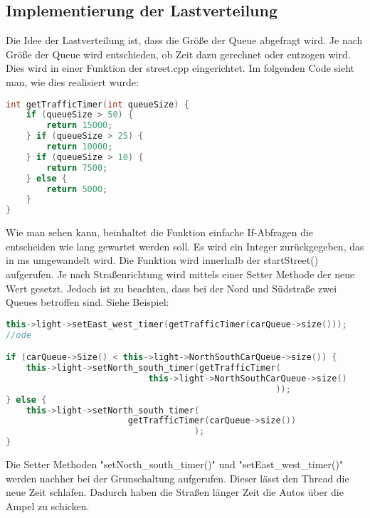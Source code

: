 \documentclass[12pt, oneside]{article}
\begin{document}
\subsection{Implementierung der Lastverteilung}
\label{lastverteilung}
Die Idee der Lastverteilung ist, dass die Größe der Queue abgefragt wird. Je nach Größe der Queue wird entschieden, ob Zeit dazu gerechnet oder entzogen wird. Dies wird in einer Funktion der street.cpp eingerichtet. Im folgenden Code sieht man, wie dies realisiert wurde:

\begin{lstlisting}[language=C++, caption={C++ street.cpp - Lastverteilungsfunktion}]
int getTrafficTimer(int queueSize) {
    if (queueSize > 50) {
        return 15000;
    } if (queueSize > 25) {
        return 10000;
    } if (queueSize > 10) {
        return 7500;
    } else {
        return 5000;
    }
}
\end{lstlisting}

\noindent Wie man sehen kann, beinhaltet die Funktion einfache If-Abfragen die entscheiden wie lang gewartet werden soll. Es wird ein Integer zurückgegeben, das in ms umgewandelt wird. Die Funktion wird innerhalb der startStreet() aufgerufen. Je nach Straßenrichtung wird mittels einer Setter Methode der neue Wert gesetzt. Jedoch ist zu beachten, dass bei der Nord und Südstraße zwei Queues betroffen sind. Siehe Beispiel:

\begin{lstlisting}[language=C++, caption={C++ street.cpp - Lastverteilungsfunktion}]
this->light->setEast_west_timer(getTrafficTimer(carQueue->size()));
//ode

if (carQueue->Size() < this->light->NorthSouthCarQueue->size()) {
    this->light->setNorth_south_timer(getTrafficTimer(
                            this->light->NorthSouthCarQueue->size()
                                                     ));
} else {
    this->light->setNorth_south_timer(
                        getTrafficTimer(carQueue->size())
                                     );
}
\end{lstlisting}

\noindent Die Setter Methoden "setNorth\_south\_timer()" und "setEast\_west\_timer()" werden nachher bei der Grunschaltung aufgerufen. Dieser lässt den Thread die neue Zeit schlafen. Dadurch haben die Straßen länger Zeit die Autos über die Ampel zu schicken.
\end{document}
